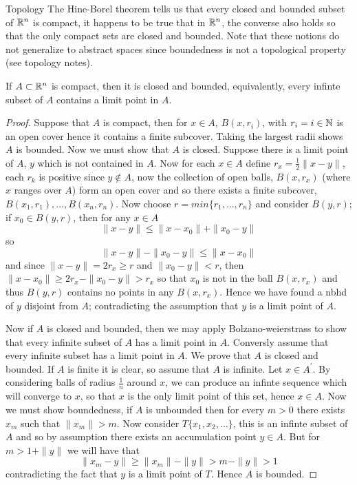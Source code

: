 \begin{chapter}{Topology}
    The Hine-Borel theorem tells us that every closed and bounded subset of $\mathbb{R}^n$ is compact, it happens to be true that 
    in $\mathbb{R}^n$, the converse also holds so that the only compact sets are closed and bounded. Note that these notions do not 
    generalize to abstract spaces since boundedness is not a topological property (see topology notes). 


    \begin{thm}
        If $A \subset \mathbb{R}^n$ is compact, then it is closed and bounded, equivalently, every infinte subset of $A$ contains a limit point in $A$.  
    \end{thm}

    \begin{proof}
        Suppose that $A$ is compact, then for $x \in A$, $B(x, r_i)$, with $r_i = i \in \mathbb{N}$ is an open cover hence it contains a finite subcover. Taking the largest radii shows $A$ is bounded. 
        Now we must show that $A$ is closed. Suppose there is a limit point of $A$, $y$ which is not contained in $A$. Now for each $x \in A$ define $r_x = \frac{1}{2}\|x-y\|$, 
        each $r_k$ is positive since $y \notin A$, now the collection of open balls, $B(x, r_x)$ (where $x$ ranges over $A$) form an open cover and so there exists a finite subcover, $B(x_1, r_1), \dots, B(x_n, r_n)$. 
        Now choose $r = min\{r_1, \dots, r_n\}$ and consider $B(y, r)$; if $x_0 \in B(y, r)$, then for any $x \in A$
        \[ \|x - y\| \leq \|x-x_0\| + \|x_0 - y \|  \]
        so 
        \[\| x - y \| - \| x_0 - y\| \leq \| x - x_0 \|\]
        and since $\|x - y \| = 2r_x \geq r$ and $\|x_0 - y \| < r$, then $\|x - x_0 \| \geq 2r_x - \|x_0 - y \| > r_x$ so that $x_0$ is not in the ball $B(x, r_x)$ and thus 
        $B(y, r)$ contains no points in any $B(x, r_x)$. Hence we have found a nbhd of $y$ disjoint from $A$; contradicting the assumption that $y$ is a limit point of $A$. 
        

        Now if $A$ is closed and bounded, then we may apply Bolzano-weierstrass to show that every infinite subset of $A$ has a limit point in $A$. Conversly assume that every infinite subset has a limit point in $A$. 
        We prove that $A$ is closed and bounded. If $A$ is finite it is clear, so assume that $A$ is infinite. Let $x \in A^\prime$. By considering balls of radius $\frac{1}{n}$ around $x$, we can produce an infinte sequence 
        which will converge to $x$, so that $x$ is the only limit point of this set, hence $x \in A$. Now we must show boundedness, if $A$ is unbounded then for every $m> 0$ there exists $x_m$ such that $\|x_m\| > m$. 
        Now consider $T \{x_1, x_2, \dots\}$, this is an infinte subset of $A$ and so by assumption there exists an accumulation point $y \in A$. But for $m > 1 + \|y\|$ we will have that 
        \begin{equation}
            \|x_m - y\| \geq \|x_m \| - \|y\| > m - \|y\| > 1
        \end{equation}
        contradicting the fact that $y$ is a limit point of $T$. Hence $A$ is bounded. 
    \end{proof}



\end{chapter}
